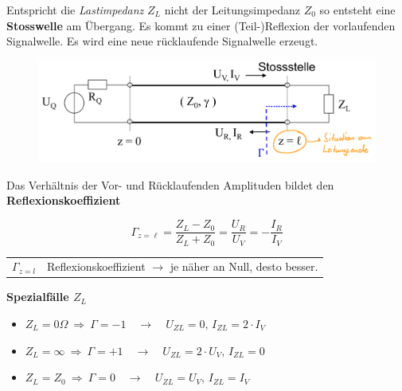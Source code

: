 \documentclass[
  10pt,
  a4paper,
  german]{article}
\makeatletter
\numberwithin{equation}{section}
\newenvironment{conditions}
  {\par\vspace{\abovedisplayskip}\noindent\begin{tabular}{>{$}l<{$} @{${}:{}$} l}}
  {\end{tabular}\par\vspace{\belowdisplayskip}}
\makeatother
\begin{document}
Entspricht die \emph{Lastimpedanz} \(Z_L\) nicht der Leitungsimpedanz
\(Z_0\) so entsteht eine \textbf{Stosswelle} am Übergang. Es kommt zu
einer (Teil-)Reflexion der vorlaufenden Signalwelle. Es wird eine neue
rücklaufende Signalwelle erzeugt.

\begin{figure}[H]

{\centering \includegraphics[width=14cm,height=\textheight]{images/03_Reflexion.png}

}

\end{figure}

Das Verhältnis der Vor- und Rücklaufenden Amplituden bildet den
\textbf{Reflexionskoeffizient}

\[
\Gamma_{z=\ell}=\frac{Z_L-Z_0}{Z_L+Z_0}=\frac{U_R}{U_V}=-\frac{I_R}{I_V}
\]

\begin{conditions}
  \Gamma_{z=l} & Reflexionskoeffizient $\rightarrow$ je näher an Null, desto besser.
\end{conditions}

\begin{tcolorbox}[enhanced jigsaw, breakable, colback=white, opacityback=0, leftrule=.75mm, colframe=quarto-callout-note-color-frame, left=2mm, bottomrule=.15mm, toprule=.15mm, rightrule=.15mm, arc=.35mm]
\begin{minipage}[t]{5.5mm}
\textcolor{quarto-callout-note-color}{\faInfo}
\end{minipage}%
\begin{minipage}[t]{\textwidth - 5.5mm}

\textbf{Spezialfälle \(Z_L\)}\vspace{2mm}

\begin{itemize}
\item
  \(Z_L = 0\Omega\ \Rightarrow\ \Gamma=-1\quad\rightarrow\quad U_{ZL}=0,\, I_{ZL}=2\cdot I_V\)
\item
  \(Z_L=\infty\ \Rightarrow\ \Gamma=+1\quad\rightarrow\quad U_{ZL}=2\cdot U_V,\, I_{ZL}=0\)
\item
  \(Z_L=Z_0\ \Rightarrow\ \Gamma=0\quad\rightarrow\quad U_{ZL}=U_V,\, I_{ZL}=I_V\)
\end{itemize}

\end{minipage}%
\end{tcolorbox}
\end{document}
